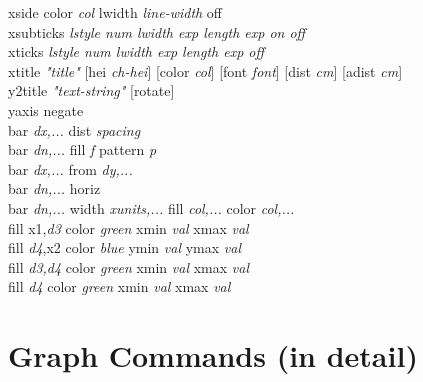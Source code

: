 {\sf xside color {\it col} lwidth {\it line-width} off  } \\
{\sf xsubticks {\it {\sf lstyle} num  {\sf lwidth} exp {\sf length} exp {\sf on} {\sf off}}} \\
{\sf xticks {\it {\sf lstyle} num {\sf lwidth} exp {\sf length} exp {\sf off}}} \\
{\sf xtitle {\it "title"} [hei {\it ch-hei}] [color {\it col}] [font {\it font}] [dist {\it cm}] [adist {\it cm}]}   \\
{\sf y2title {\it "text-string"}  [rotate]  }  \\
{\sf yaxis negate}  \\
{\sf bar {\it dx,...} dist {\it spacing}}\\
{\sf bar {\it dn,...} fill {\it f} pattern {\it p}} \\
{\sf bar {\it dx,...} from {\it dy,...}}\\
{\sf bar {\it dn,...} horiz} \\
{\sf bar {\it dn,...} width {\it xunits,...} fill {\it col,...} color {\it col,...} }\\
{\sf fill x1,{\it d3} color {\it green}  xmin {\it val} xmax {\it val}} \\
{\sf fill {\it d4},x2 color {\it blue}   ymin {\it val} ymax {\it val}} \\
{\sf fill {\it d3,d4} color {\it green}  xmin {\it val} xmax {\it val}} \\
{\sf fill {\it d4} color {\it green}  xmin {\it val} xmax {\it val}} \\


\section{Graph Commands (in detail)}

